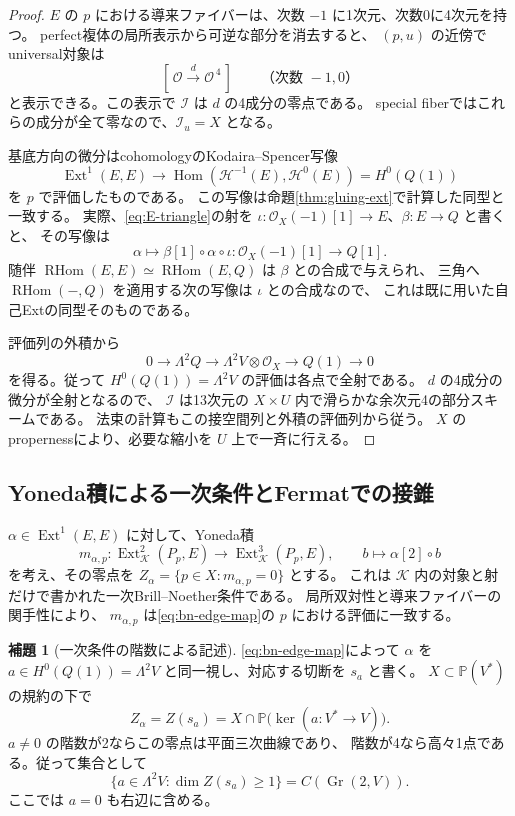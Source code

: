 \documentclass[a4paper,11pt]{ltjsarticle}
\theoremstyle{definition}
\newtheorem{lemma}[theorem]{補題}
\newcommand{\OO}{\mathcal O}
\newcommand{\PP}{\mathbb P}
\newcommand{\Gr}{\operatorname{Gr}}
\newcommand{\Ext}{\operatorname{Ext}}
\newcommand{\RHom}{\operatorname{RHom}}
\begin{document}
\begin{proof}
$E$ の $p$ における導来ファイバーは、次数 $-1$ に1次元、次数0に4次元を持つ。
perfect複体の局所表示から可逆な部分を消去すると、
$(p,u)$ の近傍でuniversal対象は
\[
 [\,\OO\xrightarrow{\,d\,}\OO^{\,4}\,]
 \qquad\text{（次数 }-1,0\text{）}
\]
と表示できる。この表示で $\mathcal I$ は $d$ の4成分の零点である。
special fiberではこれらの成分が全て零なので、$\mathcal I_u=X$ となる。

基底方向の微分はcohomologyのKodaira--Spencer写像
\[
 \Ext^1(E,E)\longrightarrow
 \operatorname{Hom}(\mathcal H^{-1}(E),\mathcal H^0(E))
 =H^0(Q(1))
\]
を $p$ で評価したものである。
この写像は命題\ref{thm:gluing-ext}で計算した同型と一致する。
実際、\eqref{eq:E-triangle}の射を
$\iota:\OO_X(-1)[1]\to E$、$\beta:E\to Q$ と書くと、
その写像は
\[
 \alpha\longmapsto
 \beta[1]\circ\alpha\circ\iota:
 \OO_X(-1)[1]\longrightarrow Q[1].
 \tag{KS}\label{eq:bn-edge-map}
\]
随伴 $\RHom(E,E)\simeq\RHom(E,Q)$ は $\beta$ との合成で与えられ、
三角へ $\RHom(-,Q)$ を適用する次の写像は $\iota$ との合成なので、
これは既に用いた自己Extの同型そのものである。

評価列の外積から
\[
 0\longrightarrow\Lambda^2Q
 \longrightarrow\Lambda^2V\otimes\OO_X
 \longrightarrow Q(1)\longrightarrow0
\]
を得る。従って $H^0(Q(1))=\Lambda^2V$ の評価は各点で全射である。
$d$ の4成分の微分が全射となるので、
$\mathcal I$ は13次元の $X\times U$ 内で滑らかな余次元4の部分スキームである。
法束の計算もこの接空間列と外積の評価列から従う。
$X$ のpropernessにより、必要な縮小を $U$ 上で一斉に行える。
\end{proof}

\subsection{Yoneda積による一次条件とFermatでの接錐}

$\alpha\in\Ext^1(E,E)$ に対して、Yoneda積
\[
 m_{\alpha,p}:\Ext^2_{\mathcal K}(P_p,E)
       \longrightarrow\Ext^3_{\mathcal K}(P_p,E),
 \qquad b\longmapsto\alpha[2]\circ b
\]
を考え、その零点を
$Z_\alpha=\{p\in X:m_{\alpha,p}=0\}$ とする。
これは $\mathcal K$ 内の対象と射だけで書かれた一次Brill--Noether条件である。
局所双対性と導来ファイバーの関手性により、
$m_{\alpha,p}$ は\eqref{eq:bn-edge-map}の $p$ における評価に一致する。

\begin{lemma}[一次条件の階数による記述]\label{lem:bn-rank}
\eqref{eq:bn-edge-map}によって $\alpha$ を
$a\in H^0(Q(1))=\Lambda^2V$ と同一視し、対応する切断を $s_a$ と書く。
$X\subset\PP(V^*)$ の規約の下で
\[
 Z_\alpha=Z(s_a)
   =X\cap\PP\bigl(\ker(a:V^*\to V)\bigr).
\]
$a\ne0$ の階数が2ならこの零点は平面三次曲線であり、
階数が4なら高々1点である。従って集合として
\[
 \{a\in\Lambda^2V:\dim Z(s_a)\ge1\}
   =C(\Gr(2,V)).
 \tag{*}\label{eq:first-bn-cone}
\]
ここでは $a=0$ も右辺に含める。
\end{lemma}
\end{document}
